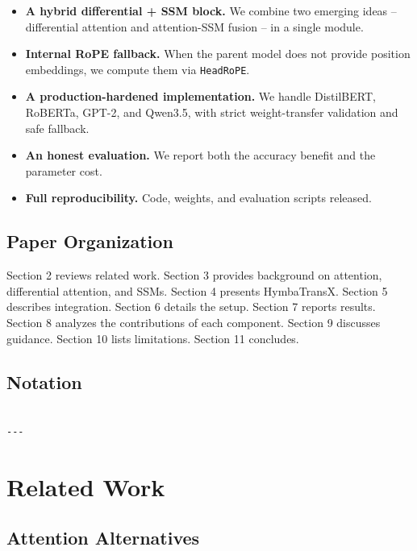 \begin{itemize}
\item \textbf{A hybrid differential + SSM block.} We combine two emerging ideas --
  differential attention and attention-SSM fusion -- in a single module.
\item \textbf{Internal RoPE fallback.} When the parent model does not provide
  position embeddings, we compute them via \texttt{HeadRoPE}.
\item \textbf{A production-hardened implementation.} We handle DistilBERT, RoBERTa,
  GPT-2, and Qwen3.5, with strict weight-transfer validation and safe
  fallback.
\item \textbf{An honest evaluation.} We report both the accuracy benefit and the
  parameter cost.
\item \textbf{Full reproducibility.} Code, weights, and evaluation scripts released.

\end{itemize}
\subsection{Paper Organization}

Section 2 reviews related work. Section 3 provides background on attention, 
differential attention, and SSMs. Section 4 presents HymbaTransX. Section 5 
describes integration. Section 6 details the setup. Section 7 reports 
results. Section 8 analyzes the contributions of each component. Section 9 
discusses guidance. Section 10 lists limitations. Section 11 concludes.



\subsection{Notation}

\begin{lstlisting}

---
\end{lstlisting}

\section{Related Work}

\subsection{Attention Alternatives}

